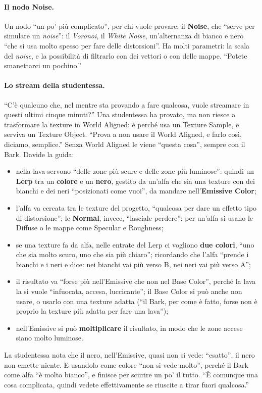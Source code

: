 \paragraph{Il nodo Noise.} Un nodo ``un po' più complicato'', per chi vuole provare: il
\textbf{Noise}, che ``serve per simulare un \emph{noise}'': il \emph{Voronoi}, il
\emph{White Noise}, un'alternanza di bianco e nero ``che si usa molto spesso per fare
delle distorsioni''. Ha molti parametri: la scala del \emph{noise}, e la possibilità di
filtrarlo con dei vettori o con delle mappe. ``Potete smanettarci un pochino.''

\paragraph{Lo stream della studentessa.} ``C'è qualcuno che, nel mentre sta provando a
fare qualcosa, vuole streamare in questi ultimi cinque minuti?'' Una studentessa ha
provato, ma non riesce a trasformare la texture in World Aligned: è perché usa un
Texture Sample, e serviva un Texture Object. ``Prova a non usare il World Aligned, e
farlo così, diciamo, semplice.'' Senza World Aligned le viene ``questa cosa'', sempre
con il Bark. Davide la guida:
\begin{itemize}
  \item nella lava servono ``delle zone più scure e delle zone più luminose'': quindi
        un \textbf{Lerp} tra un \textbf{colore} e un \textbf{nero}, gestito da un'alfa
        che sia una texture con dei bianchi e dei neri ``posizionati come vuoi'', da
        mandare nell'\textbf{Emissive Color};
  \item l'alfa va cercata tra le texture del progetto, ``qualcosa per dare un effetto
        tipo di distorsione''; le \textbf{Normal}, invece, ``lasciale perdere'': per
        un'alfa si usano le Diffuse o le mappe come Specular e Roughness;
  \item se una texture fa da alfa, nelle entrate del Lerp ci vogliono \textbf{due
        colori}, ``uno che sia molto scuro, uno che sia più chiaro''; ricordando che
        l'alfa ``prende i bianchi e i neri e dice: nei bianchi vai più verso B, nei neri
        vai più verso A'';
  \item il risultato va ``forse più nell'Emissive che non nel Base Color'', perché la
        lava la si vuole ``infuocata, accesa, luccicante''; il Base Color si può anche
        non usare, o usarlo con una texture adatta (``il Bark, per come è fatto, forse
        non è proprio la texture più adatta per fare una lava'');
  \item nell'Emissive si può \textbf{moltiplicare} il risultato, in modo che le zone
        accese siano molto luminose.
\end{itemize}
La studentessa nota che il nero, nell'Emissive, quasi non si vede: ``esatto'', il nero
non emette niente. E usandolo come colore ``non si vede molto'', perché il Bark come alfa
``è molto bianco'', e finisce per scurire un po' il tutto. ``È comunque una cosa
complicata, quindi vedete effettivamente se riuscite a tirar fuori qualcosa.''

